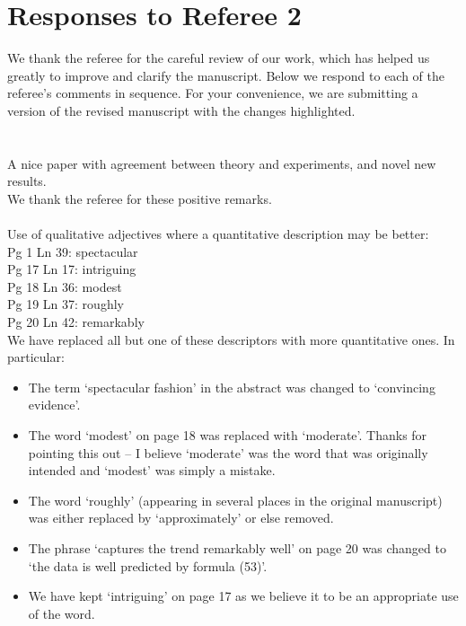 \documentclass[11pt]{article}
\newcommand{\comment}[1]{{\color{blue} #1}}
\begin{document}
\section*{Responses to Referee 2}

We thank the referee for the careful review of our work, which has helped us greatly to improve and clarify the manuscript. Below we respond to each of the referee's comments in sequence. For your convenience, we are submitting a version of the revised manuscript with the changes highlighted. \\ \\ \\


\noindent
\comment{A nice paper with agreement between theory and experiments, and novel new results.} \\

\noindent
We thank the referee for these positive remarks. \\ \\

\noindent
\comment{
Use of qualitative adjectives where a quantitative description may be better: \\
Pg 1 Ln 39: spectacular \\
Pg 17 Ln 17: intriguing \\
Pg 18 Ln 36: modest \\
Pg 19 Ln 37: roughly \\
Pg 20 Ln 42: remarkably} \\

\noindent
We have replaced all but one of these descriptors with more quantitative ones. In particular:
\begin{itemize}
\item The term `spectacular fashion' in the abstract was changed to `convincing evidence'.
\item The word `modest' on page 18 was replaced with `moderate'. Thanks for pointing this out -- I believe `moderate' was the word that was originally intended and `modest' was simply a mistake.
\item The word `roughly' (appearing in several places in the original manuscript) was either replaced by `approximately' or else removed.
\item The phrase `captures the trend remarkably well' on page 20 was changed to `the data is well predicted by formula (53)'.
\item We have kept `intriguing' on page 17 as we believe it to be an appropriate use of the word.
\end{itemize}
\hphantom \\
\end{document}
